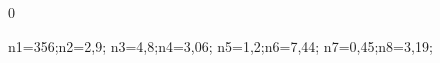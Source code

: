 0\documentclass[exercice]{thedocument}%
\begin{document}
%
\>n1=356;\>n2=2,9;%
\>n3=4,8;\>n4=3,06;%
\>n5=1,2;\>n6=7,44;%
\>n7=0,45;\>n8=3,19;%
%
\end{document}
